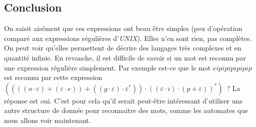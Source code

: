 \vphantom{}

\subsection{Conclusion}

On saisit aisément que ces expressions ont beau être simples (peu d'opération
comparé aux expressions régulières d'\textit{UNIX}). Elles n'en sont rien, pas
complètes. On peut voir qu'elles permettent de décrire des langages très
complexes et en quantité infinie. En revanche, il est difficile de savoir si un
mot est reconnu par une expression régulière simplement. Par exemple est-ce que
le mot \(eipipipipipip\) est reconnu par cette expression \(((((o \cdot
\varepsilon)+(\varepsilon \cdot e))+((g\cdot \varepsilon) \cdot \varepsilon^*))
\cdot ((\varepsilon \cdot i)\cdot (p+\varepsilon))^*)\)~? La réponse est oui.
C'est pour cela qu'il serait peut-être intéressant d'utiliser une autre
structure de donnée pour reconnaitre des mots, comme les automates que nous
allons voir maintenant.
